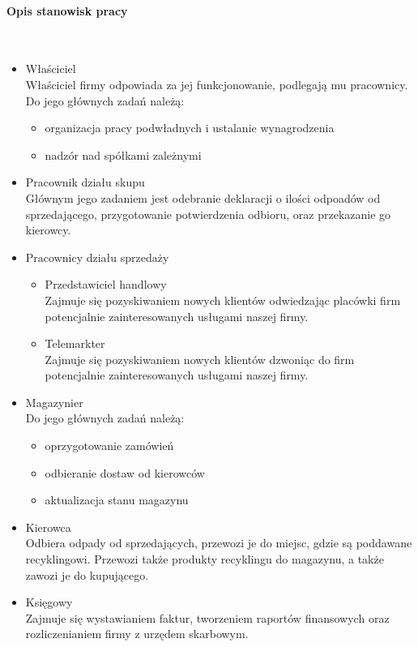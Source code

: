 
\paragraph{Opis stanowisk pracy} \ \\
\begin{itemize}
	\item Właściciel \\ 
	Właściciel firmy odpowiada za jej funkcjonowanie, podlegają mu pracownicy. Do jego głównych zadań należą:
	\begin{itemize}
		\item organizacja pracy podwładnych i ustalanie wynagrodzenia
		\item nadzór nad spółkami zależnymi
	\end{itemize}
	\item Pracownik działu skupu \\
	Głównym jego zadaniem jest odebranie deklaracji o ilości odpoadów od sprzedającego, przygotowanie potwierdzenia odbioru, oraz przekazanie go kierowcy.
	\item Pracownicy działu sprzedaży
	\begin{itemize}
	\item Przedstawiciel handlowy \\
	Zajmuje się pozyskiwaniem nowych klientów odwiedzając placówki firm potencjalnie zainteresowanych usługami naszej firmy.
	\item Telemarkter \\
	Zajmuje się pozyskiwaniem nowych klientów dzwoniąc do firm potencjalnie zainteresowanych usługami naszej firmy.
	\end{itemize}
	\item Magazynier \\
	Do jego głównych zadań należą:
		\begin{itemize}
		\item oprzygotowanie zamówień
		\item odbieranie dostaw od kierowców
		\item aktualizacja stanu magazynu
		\end{itemize}
	\item Kierowca \\
	Odbiera odpady od sprzedających, przewozi je do miejsc, gdzie są poddawane recyklingowi. Przewozi także produkty recyklingu do magazynu, a także zawozi je do kupującego.
	\item Księgowy \\
	Zajmuje się wystawianiem faktur, tworzeniem raportów finansowych oraz rozliczenianiem firmy z urzędem skarbowym.
	
\end{itemize}

